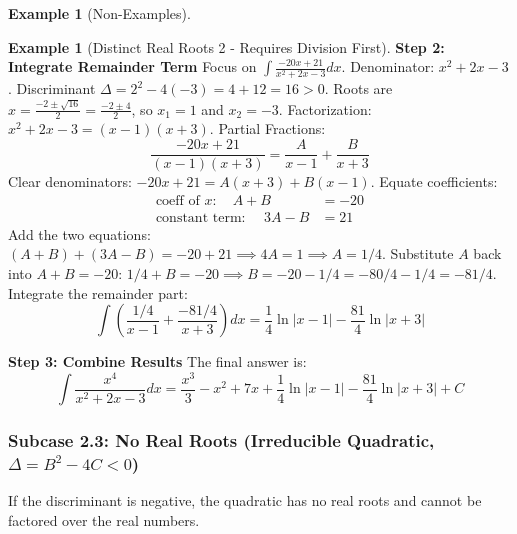\documentclass[11pt]{article}
\theoremstyle{plain}
\theoremstyle{definition}
\newtheorem{example}[theorem]{Example}
\theoremstyle{remark}
\newcommand{\abs}[1]{\left|#1\right|}
\begin{document}
\begin{example}[Non-Examples]
\begin{example}[Distinct Real Roots 2 - Requires Division First]
\textbf{Step 2: Integrate Remainder Term}
Focus on $\int \frac{-20x+21}{x^2+2x-3} dx$.
Denominator: $x^2+2x-3$. Discriminant $\Delta = 2^2 - 4(-3) = 4+12 = 16 > 0$.
Roots are $x = \frac{-2 \pm \sqrt{16}}{2} = \frac{-2 \pm 4}{2}$, so $x_1 = 1$ and $x_2 = -3$.
Factorization: $x^2+2x-3 = (x-1)(x+3)$.
Partial Fractions:
\[ \frac{-20x+21}{(x-1)(x+3)} = \frac{A}{x-1} + \frac{B}{x+3} \]
Clear denominators: $-20x+21 = A(x+3) + B(x-1)$.
Equate coefficients:
\begin{align*} \text{coeff of } x: \quad A+B &= -20 \\ \text{constant term: } \quad 3A-B &= 21 \end{align*}
Add the two equations: $(A+B)+(3A-B) = -20+21 \implies 4A = 1 \implies A = 1/4$.
Substitute $A$ back into $A+B=-20$: $1/4 + B = -20 \implies B = -20 - 1/4 = -80/4 - 1/4 = -81/4$.
Integrate the remainder part:
\[ \int \left( \frac{1/4}{x-1} + \frac{-81/4}{x+3} \right) dx = \frac{1}{4} \ln\abs{x-1} - \frac{81}{4} \ln\abs{x+3} \]

\textbf{Step 3: Combine Results}
The final answer is:
\[ \int \frac{x^4}{x^2+2x-3} dx = \frac{x^3}{3} - x^2 + 7x + \frac{1}{4} \ln\abs{x-1} - \frac{81}{4} \ln\abs{x+3} + C \]
\end{example}

\subsubsection{Subcase 2.3: No Real Roots (Irreducible Quadratic, $\Delta = B^2-4C < 0$)}

If the discriminant is negative, the quadratic has no real roots and cannot be factored over the real numbers.


\end{example}
\end{document}
